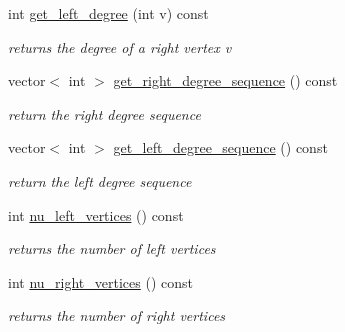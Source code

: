 \begin{DoxyCompactItemize}
int \hyperlink{classb__graph_ac64ac5cb1197d8008e07babc333eb3ea}{get\+\_\+left\+\_\+degree} (int v) const
\begin{DoxyCompactList}\small\item\em returns the degree of a right vertex v \end{DoxyCompactList}\item 
vector$<$ int $>$ \hyperlink{classb__graph_a2711566385b92b02f4c03abdc1f9a582}{get\+\_\+right\+\_\+degree\+\_\+sequence} () const
\begin{DoxyCompactList}\small\item\em return the right degree sequence \end{DoxyCompactList}\item 
vector$<$ int $>$ \hyperlink{classb__graph_afd65fb655f7e24217393a10533b87d3c}{get\+\_\+left\+\_\+degree\+\_\+sequence} () const
\begin{DoxyCompactList}\small\item\em return the left degree sequence \end{DoxyCompactList}\item 
int \hyperlink{classb__graph_a5e71d5c97f2501b0b93c17146cf7e68e}{nu\+\_\+left\+\_\+vertices} () const
\begin{DoxyCompactList}\small\item\em returns the number of left vertices \end{DoxyCompactList}\item 
int \hyperlink{classb__graph_abecfd7d6fbd0d9a554fe0d9aa3241a04}{nu\+\_\+right\+\_\+vertices} () const
\begin{DoxyCompactList}\small\item\em returns the number of right vertices \end{DoxyCompactList}\end{DoxyCompactItemize}
